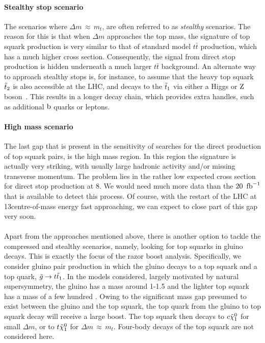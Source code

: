 \paragraph{Stealthy stop scenario}
The scenarios where $\Delta m\,{\approx}\, m_t$, are often referred to as \textit{stealthy}
scenarios. The reason for this is that when $\Delta m$ approaches the top mass, the signature of
top squark production is very similar to that of standard model $t\bar{t}$ production,
which has a much higher cross section. Consequently, the signal from direct stop production is
hidden underneath a much larger $t\bar{t}$ background. An alternate way to approach stealthy stops
is, for instance, to assume that the heavy top squark $\tilde{t}_2$ is also accessible at the LHC, and
decays to the $\tilde{t}_1$ via either a Higgs or $\mathrm{Z}$ boson~\cite{Khachatryan:2014doa}. This
results in a longer decay chain, which provides extra handles, such as additional $\mathrm{b}$ quarks or
leptons. 

\paragraph{High mass scenario}
The last gap that is present in the sensitivity of searches for the direct production of top squark
pairs, is the high mass region. In this region the signature is actually very striking, with
usually large hadronic activity and/or missing transverse momentum. The problem lies in the rather
low expected cross section for direct stop production at 8\TeV. We would need much more data than
the $20~\mbox{\ensuremath{\,\text{fb}^\text{$-$1}}}$ that is available to detect this process. 
Of course, with the restart of the LHC at 13\TeV centre-of-mass energy fast approaching, we can
expect to close part of this gap very soon.

\paragraph{}
Apart from the approaches mentioned above, there is another option to tackle the compressed and
stealthy scenarios, namely, looking for top squarks in gluino decays. This is exactly the focus of
the razor boost analysis. 
Specifically, we consider gluino pair production in which the gluino decays to a top squark and a
top quark, $\tilde{g} \rightarrow t \tilde{t}_1$. In the models considered, largely motivated by
natural supersymmetry, the gluino has a mass around 1-1.5 \TeV and the lighter top squark has a mass
of a few hundred \GeV. Owing to the significant mass gap presumed to exist between the gluino and
the top squark, the top quark from the gluino to top squark decay will receive a large boost.  
The top squark then decays to $c \tilde{\chi}_1^0$ for small $\Delta m$, or to $t \tilde{\chi}_1^0$ for $\Delta m
\,{\approx}\, m_t$. Four-body decays of the top squark are not considered here. 

